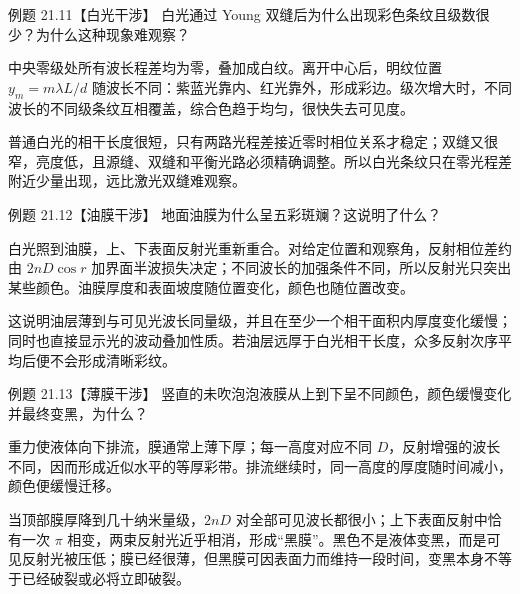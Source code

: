 \begin{origexamplebox}{例题 21.11【白光干涉】}
白光通过 Young 双缝后为什么出现彩色条纹且级数很少？为什么这种现象难观察？
\end{origexamplebox}
\begin{xesolution}
中央零级处所有波长程差均为零，叠加成白纹。离开中心后，明纹位置 $y_m=m\lambda L/d$ 随波长不同：紫蓝光靠内、红光靠外，形成彩边。级次增大时，不同波长的不同级条纹互相覆盖，综合色趋于均匀，很快失去可见度。

普通白光的相干长度很短，只有两路光程差接近零时相位关系才稳定；双缝又很窄，亮度低，且源缝、双缝和平衡光路必须精确调整。所以白光条纹只在零光程差附近少量出现，远比激光双缝难观察。
\end{xesolution}

\begin{origexamplebox}{例题 21.12【油膜干涉】}
地面油膜为什么呈五彩斑斓？这说明了什么？
\end{origexamplebox}
\begin{xesolution}
白光照到油膜，上、下表面反射光重新重合。对给定位置和观察角，反射相位差约由 $2nD\cos r$ 加界面半波损失决定；不同波长的加强条件不同，所以反射光只突出某些颜色。油膜厚度和表面坡度随位置变化，颜色也随位置改变。

这说明油层薄到与可见光波长同量级，并且在至少一个相干面积内厚度变化缓慢；同时也直接显示光的波动叠加性质。若油层远厚于白光相干长度，众多反射次序平均后便不会形成清晰彩纹。
\end{xesolution}

\begin{origexamplebox}{例题 21.13【薄膜干涉】}
竖直的未吹泡泡液膜从上到下呈不同颜色，颜色缓慢变化并最终变黑，为什么？
\end{origexamplebox}
\begin{xesolution}
重力使液体向下排流，膜通常上薄下厚；每一高度对应不同 $D$，反射增强的波长不同，因而形成近似水平的等厚彩带。排流继续时，同一高度的厚度随时间减小，颜色便缓慢迁移。

当顶部膜厚降到几十纳米量级，$2nD$ 对全部可见波长都很小；上下表面反射中恰有一次 $\pi$ 相变，两束反射光近乎相消，形成“黑膜”。黑色不是液体变黑，而是可见反射光被压低；膜已经很薄，但黑膜可因表面力而维持一段时间，变黑本身不等于已经破裂或必将立即破裂。
\end{xesolution}

\NewtonRingsDiagram

